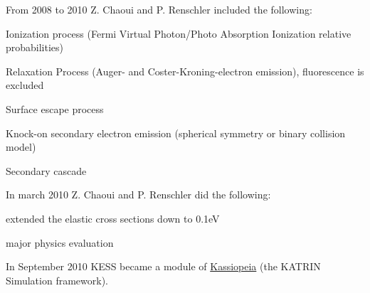 From 2008 to 2010 Z. Chaoui and P. Renschler included the following:
\begin{DoxyItemize}
\item Ionization process (Fermi Virtual Photon/Photo Absorption Ionization relative probabilities)
\item Relaxation Process (Auger-\/ and Coster-\/Kroning-\/electron emission), fluorescence is excluded
\item Surface escape process
\item Knock-\/on secondary electron emission (spherical symmetry or binary collision model)
\item Secondary cascade
\end{DoxyItemize}

In march 2010 Z. Chaoui and P. Renschler did the following:
\begin{DoxyItemize}
\item extended the elastic cross sections down to 0.1eV
\item major physics evaluation
\end{DoxyItemize}

In September 2010 KESS became a module of \hyperlink{namespace_kassiopeia}{Kassiopeia} (the KATRIN Simulation framework). 



